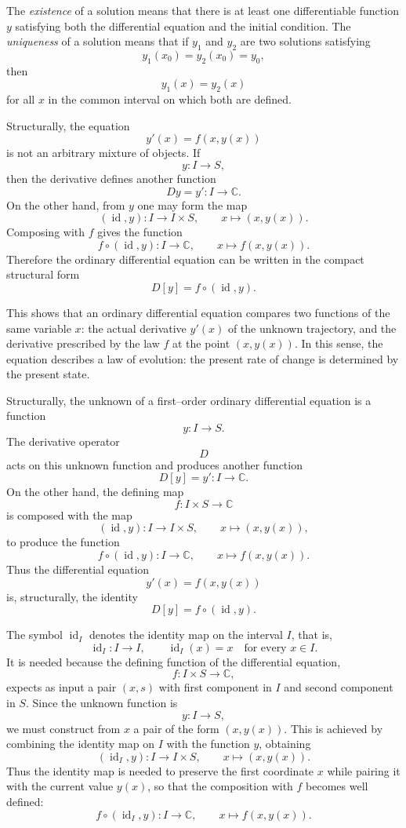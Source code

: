 \documentclass[12pt]{article}
\begin{document}
	The \emph{existence} of a solution means that there is at least one differentiable function \(y\) satisfying both the differential equation and the initial condition. The \emph{uniqueness} of a solution means that if \(y_1\) and \(y_2\) are two solutions satisfying
	$$
	y_1(x_0)=y_2(x_0)=y_0,
	$$
	then
	$$
	y_1(x)=y_2(x)
	$$
	for all \(x\) in the common interval on which both are defined.
	
	Structurally, the equation
	$$
	y'(x)=f(x,y(x))
	$$
	is not an arbitrary mixture of objects. If
	$$
	y:I\to S,
	$$
	then the derivative defines another function
	$$
	Dy=y' : I \to \mathbb{C}.
	$$
	On the other hand, from \(y\) one may form the map
	$$
	(\operatorname{id},y): I \to I\times S,
	\qquad
	x \mapsto (x,y(x)).
	$$
	Composing with \(f\) gives the function
	$$
	f\circ (\operatorname{id},y): I\to\mathbb{C},
	\qquad
	x \mapsto f(x,y(x)).
	$$
	Therefore the ordinary differential equation can be written in the compact structural form
	$$
	D[y] = f \circ (\operatorname{id},y).
	$$
	
	This shows that an ordinary differential equation compares two functions of the same variable \(x\): the actual derivative \(y'(x)\) of the unknown trajectory, and the derivative prescribed by the law \(f\) at the point \((x,y(x))\). In this sense, the equation describes a law of evolution: the present rate of change is determined by the present state.
	
	Structurally, the unknown of a first--order ordinary differential equation is a function
	$$
	y:I\to S.
	$$
	The derivative operator
	$$
	D
	$$
	acts on this unknown function and produces another function
	$$
	D[y]=y' : I\to\mathbb{C}.
	$$
	On the other hand, the defining map
	$$
	f:I\times S\to\mathbb{C}
	$$
	is composed with the map
	$$
	(\operatorname{id},y):I\to I\times S,\qquad x\mapsto (x,y(x)),
	$$
	to produce the function
	$$
	f\circ(\operatorname{id},y):I\to\mathbb{C},\qquad x\mapsto f(x,y(x)).
	$$
	Thus the differential equation
	$$
	y'(x)=f(x,y(x))
	$$
	is, structurally, the identity
	$$
	D[y]=f\circ(\operatorname{id},y).
	$$
	
	The symbol \(\operatorname{id}_I\) denotes the identity map on the interval \(I\), that is,
	$$
	\operatorname{id}_I : I \to I, \qquad \operatorname{id}_I(x)=x
	\quad \text{for every } x\in I.
	$$
	It is needed because the defining function of the differential equation,
	$$
	f : I\times S \to \mathbb{C},
	$$
	expects as input a pair \((x,s)\) with first component in \(I\) and second component in \(S\). Since the unknown function is
	$$
	y:I\to S,
	$$
	we must construct from \(x\) a pair of the form \((x,y(x))\). This is achieved by combining the identity map on \(I\) with the function \(y\), obtaining
	$$
	(\operatorname{id}_I,y): I \to I\times S, \qquad x\mapsto (x,y(x)).
	$$
	Thus the identity map is needed to preserve the first coordinate \(x\) while pairing it with the current value \(y(x)\), so that the composition with \(f\) becomes well defined:
	$$
	f\circ(\operatorname{id}_I,y): I \to \mathbb{C}, \qquad x\mapsto f(x,y(x)).
	$$
	
\end{document}
